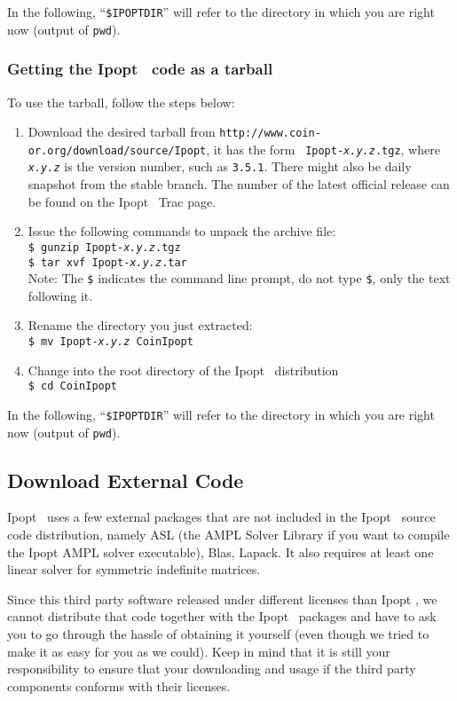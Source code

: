 \documentclass[10pt]{article}
\newcommand{\Ipopt}{{\sc Ipopt }}
\begin{document}
In the following, ``\texttt{\$IPOPTDIR}'' will refer to the directory in
which you are right now (output of \texttt{pwd}).

\subsubsection{Getting the \Ipopt\ code as a tarball}

To use the tarball, follow the steps below:
\begin{enumerate}
\item Download the desired tarball from
  \texttt{http://www.coin-or.org/download/source/Ipopt}, it has the form {\tt
    Ipopt-{\em x.y.z}.tgz}, where {\tt\em x.y.z} is the version
  number, such as {\tt 3.5.1}.  There might also be daily snapshot
  from the stable branch.  The number of the latest official release
  can be found on the \Ipopt\ Trac page.
\item Issue the following commands to unpack the archive file: \\
\texttt{\$ gunzip Ipopt-{\em x.y.z}.tgz} \\
\texttt{\$ tar xvf Ipopt-{\em x.y.z}.tar} \\
Note: The {\tt \$} indicates the command line
prompt, do not type {\tt \$}, only the text following it.
\item Rename the directory you just extracted:\\
\texttt{\$ mv Ipopt-{\em x.y.z} CoinIpopt}
\item Change into the root directory of the \Ipopt\ distribution\\
{\tt \$ cd CoinIpopt}
\end{enumerate}

In the following, ``\texttt{\$IPOPTDIR}'' will refer to the directory in
which you are right now (output of \texttt{pwd}).

\subsection{Download External Code}\label{ExternalCode}
\Ipopt\ uses a few external packages that are not included in the
\Ipopt\ source code distribution, namely ASL (the AMPL Solver Library
if you want to compile the Ipopt AMPL solver executable), Blas,
Lapack.  It also requires at least one linear solver for symmetric
indefinite matrices.

Since this third party software released under different licenses than
\Ipopt, we cannot distribute that code together with the \Ipopt\
packages and have to ask you to go through the hassle of obtaining it
yourself (even though we tried to make it as easy for you as we
could).  Keep in mind that it is still your responsibility to ensure
that your downloading and usage if the third party components conforms
with their licenses.
\end{document}
